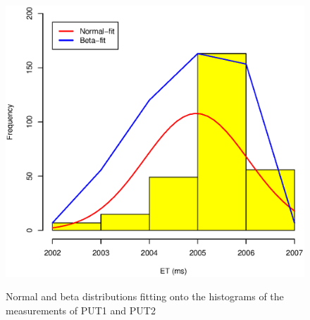\documentclass[10pt]{article}
\begin{document}
\begin{figure}[H]
{		\includegraphics[scale=0.43]{figures/sodb12-ntp-on-turbo-off/2_sec_et_hist.eps}
		\label{fig:2_sec_et_hist1}
	}
	\caption{Normal and beta distributions fitting onto the histograms of the measurements of PUT1 and PUT2~\label{fig:extra_pt_hist1}}
\end{figure}
\end{document}
